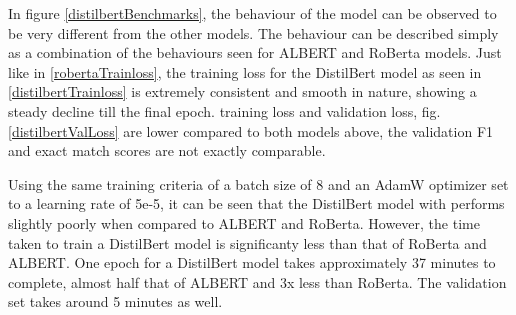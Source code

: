 \documentclass[a4paper,12pt]{report}
\begin{document}
	In figure \ref{distilbertBenchmarks}, the behaviour of the model can be observed to be very different from the other models. The behaviour can be described simply as a combination of the behaviours seen for ALBERT and RoBerta models. Just like in \ref{robertaTrainloss}, the training loss for the DistilBert model as seen in \ref{distilbertTrainloss} is extremely consistent and smooth in nature, showing a steady decline till the final epoch. training loss and validation loss, fig. \ref{distilbertValLoss} are lower compared to both models above, the validation F1 and exact match scores are not exactly comparable.

	Using the same training criteria of a batch size of 8 and an AdamW optimizer set to a learning rate of 5e-5, it can be seen that the DistilBert model with performs slightly poorly when compared to ALBERT and RoBerta. However, the time taken to train a DistilBert model is significanty less than that of RoBerta and ALBERT. One epoch for a DistilBert model takes approximately 37 minutes to complete, almost half that of ALBERT and 3x less than RoBerta. The validation set takes around 5 minutes as well.
\end{document}

